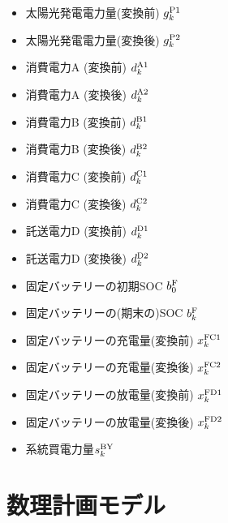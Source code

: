 \documentclass{jarticle}
\newcommand{\IB}{$\bullet$}
\newcommand{\IC}{$\circ$}
\begin{document}
 \begin{itemize}
  \item[\IB] 太陽光発電電力量(変換前) $g^{\rm P1}_{k}$
  \item[\IC] 太陽光発電電力量(変換後) $g^{\rm P2}_{k}$
  \item[\IC] 消費電力A (変換前) $d^{\rm A1}_{k}$
  \item[\IB] 消費電力A (変換後) $d^{\rm A2}_{k}$
  \item[\IC] 消費電力B (変換前) $d^{\rm B1}_{k}$
  \item[\IB] 消費電力B (変換後) $d^{\rm B2}_{k}$
  \item[\IC] 消費電力C (変換前) $d^{\rm C1}_{k}$
  \item[\IB] 消費電力C (変換後) $d^{\rm C2}_{k}$
  \item[\IC] 託送電力D (変換前) $d^{\rm D1}_{k}$
  \item[\IC] 託送電力D (変換後) $d^{\rm D2}_{k}$
  \item[\IB] 固定バッテリーの初期SOC $b^{\rm F}_{0}$
  \item[\IC] 固定バッテリーの(期末の)SOC $b^{\rm F}_{k}$
  \item[\IC] 固定バッテリーの充電量(変換前) $x^{\rm FC1}_{k}$
  \item[\IC] 固定バッテリーの充電量(変換後) $x^{\rm FC2}_{k}$
  \item[\IC] 固定バッテリーの放電量(変換前) $x^{\rm FD1}_{k}$
  \item[\IC] 固定バッテリーの放電量(変換後) $x^{\rm FD2}_{k}$ \\[-2.5ex]

  \item[\IC] 系統買電力量$s^{\rm BY}_{k}$
\end{itemize}


\section{数理計画モデル}
\end{document}
